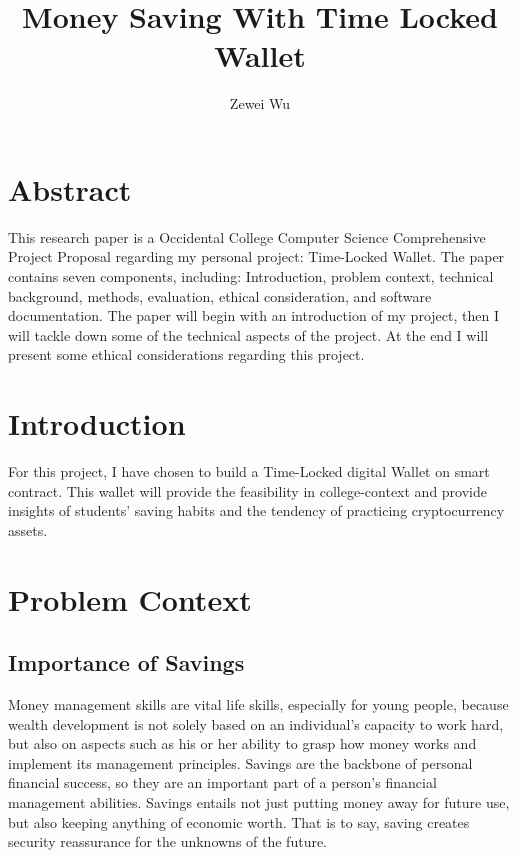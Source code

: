\documentclass[10pt,twocolumn]{article}
\title{Money Saving With Time Locked Wallet}
\author{Zewei Wu}
\affiliation{Occidental College}
\begin{document}
\maketitle

\section{Abstract}
This research paper is a Occidental College Computer Science Comprehensive Project Proposal regarding my personal project: Time-Locked Wallet. The paper contains seven components, including: Introduction, problem context, technical background, methods, evaluation, ethical consideration, and software documentation. The paper will begin with an introduction of my project, then I will tackle down some of the technical aspects of the project. At the end I will present some ethical considerations regarding this project.

\section{Introduction}

For this project, I have chosen to build a Time-Locked digital Wallet on smart contract. This wallet will provide the feasibility in college-context and provide insights of students' saving habits and the tendency of practicing cryptocurrency assets.


\section{Problem Context}
	
\subsection{Importance of Savings}
Money management skills are vital life skills, especially for young people, because wealth development is not solely based on an individual's capacity to work hard, but also on aspects such as his or her ability to grasp how money works and implement its management principles. Savings are the backbone of personal financial success, so they are an important part of a person's financial management abilities. Savings entails not just putting money away for future use, but also keeping anything of economic worth. That is to say, saving creates security reassurance for the unknowns of the future.
\end{document}
